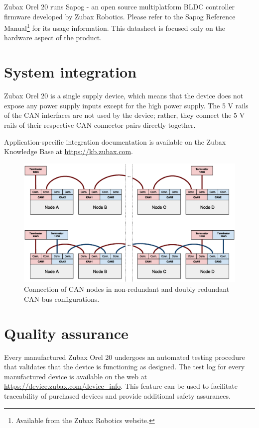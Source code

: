 \documentclass{zubaxdoc}
\begin{document}
Zubax Orel 20 runs Sapog - an open source multiplatform BLDC controller firmware
developed by Zubax Robotics.
Please refer to the Sapog Reference Manual\footnote{Available from the Zubax Robotics website.}
for its usage information.
This datasheet is focused only on the hardware aspect of the product.

\section{System integration}

Zubax Orel 20 is a single supply device, which means that the device does
not expose any power supply inputs except for the high power supply.
The 5 V rails of the CAN interfaces are not used by the device; rather,
they connect the 5 V rails of their respective CAN connector pairs directly together.

Application-specific integration documentation is available on the Zubax Knowledge Base at
\mbox{\url{https://kb.zubax.com}}.

\begin{figure}[hb]
    \centering
	\includegraphics[width=\textwidth]{can_daisy_chain}
	\caption{Connection of CAN nodes in non-redundant and doubly redundant CAN bus configurations.
	\label{can_daisy_chain_non_redundant}}
\end{figure}

\section{Quality assurance}

Every manufactured Zubax Orel 20 undergoes an automated testing procedure that validates that
the device is functioning as designed.
The test log for every manufactured device is available on the web at
\url{https://device.zubax.com/device_info}.
This feature can be used to facilitate traceability of purchased devices and
provide additional safety assurances.
\end{document}
